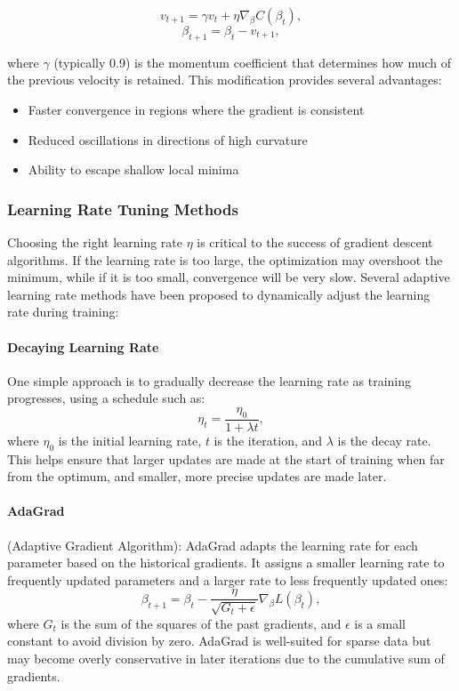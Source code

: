 \begin{equation}
    v_{t+1} = \gamma v_t + \eta \nabla_\beta C(\beta_t),
\end{equation}
\begin{equation}
    \beta_{t+1} = \beta_t - v_{t+1},
\end{equation}

where \( \gamma \) (typically 0.9) is the momentum coefficient that determines how much of the previous velocity is retained. This modification provides several advantages:
\begin{itemize}
    \item Faster convergence in regions where the gradient is consistent
    \item Reduced oscillations in directions of high curvature
    \item Ability to escape shallow local minima
\end{itemize}

\subsubsection{Learning Rate Tuning Methods} \label{sec:learning_rate_tuning}

Choosing the right learning rate \( \eta \) is critical to the success of gradient descent algorithms. If the learning rate is too large, the optimization may overshoot the minimum, while if it is too small, convergence will be very slow. Several adaptive learning rate methods have been proposed to dynamically adjust the learning rate during training:

\paragraph*{Decaying Learning Rate}

One simple approach is to gradually decrease the learning rate as training progresses, using a schedule such as:
\[
    \eta_t = \frac{\eta_0}{1 + \lambda t},
\]
where \( \eta_0 \) is the initial learning rate, \( t \) is the iteration, and \( \lambda \) is the decay rate. This helps ensure that larger updates are made at the start of training when far from the optimum, and smaller, more precise updates are made later.

\paragraph*{AdaGrad}
(Adaptive Gradient Algorithm): AdaGrad adapts the learning rate for each parameter based on the historical gradients. It assigns a smaller learning rate to frequently updated parameters and a larger rate to less frequently updated ones:
\[
    \beta_{t+1} = \beta_t - \frac{\eta}{\sqrt{G_t + \epsilon}} \nabla_\beta L(\beta_t),
\]
where \( G_t \) is the sum of the squares of the past gradients, and \( \epsilon \) is a small constant to avoid division by zero. AdaGrad is well-suited for sparse data but may become overly conservative in later iterations due to the cumulative sum of gradients.

